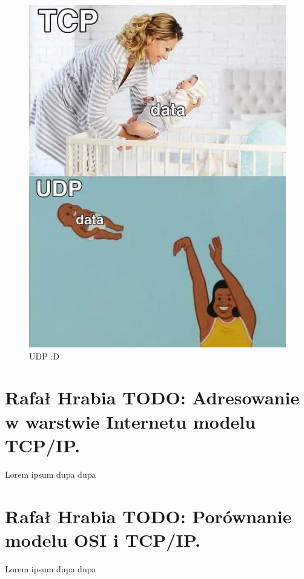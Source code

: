 \documentclass[a4paper,12pt,oneside]{book}
\begin{document}
		\begin{figure}[h!]
			\centering\includegraphics[scale=0.35]{udp.jpg}
			\caption{UDP :D}
		\end{figure}
		
		\setcounter{section}{9}
		\section{\color{green}Rafał Hrabia \color{red} TODO: Adresowanie w warstwie Internetu modelu TCP/IP.}
		
		Lorem ipsum dupa dupa
		
		\setcounter{section}{11}
		\section{\color{green}Rafał Hrabia \color{red} TODO: Porównanie modelu OSI i TCP/IP. }
		
		Lorem ipsum dupa dupa
		
\end{document}
